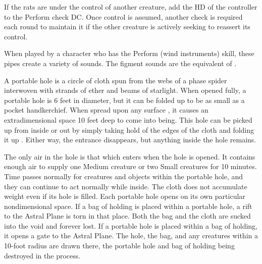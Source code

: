{If the rats are under the control of another creature, add the HD of the controller to the Perform check DC. Once control is assumed, another check is required each round to maintain it if the other creature is actively seeking to reassert its control.


 When played by a character who has the Perform (wind instruments) skill, these pipes create a variety of sounds. The figment sounds are the equivalent of .


 A portable hole is a circle of cloth spun from the webs of a phase spider interwoven with strands of ether and beams of starlight. When opened fully, a portable hole is 6 feet in diameter, but it can be folded up to be as small as a pocket handkerchief. When spread upon any surface , it causes an extradimensional space 10 feet deep to come into being. This hole can be picked up from inside or out by simply taking hold of the edges of the cloth and folding it up . Either way, the entrance disappears, but anything inside the hole remains.

The only air in the hole is that which enters when the hole is opened. It contains enough air to supply one Medium creature or two Small creatures for 10 minutes. Time passes normally for creatures and objects within the portable hole, and they can continue to act normally while inside. The cloth does not accumulate weight even if its hole is filled. Each portable hole opens on its own particular nondimensional space. If a bag of holding is placed within a portable hole, a rift to the Astral Plane is torn in that place. Both the bag and the cloth are sucked into the void and forever lost. If a portable hole is placed within a bag of holding, it opens a gate to the Astral Plane. The hole, the bag, and any creatures within a 10-foot radius are drawn there, the portable hole and bag of holding being destroyed in the process.

}
